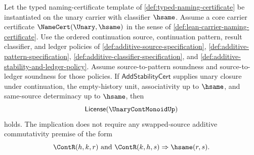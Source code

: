\begin{theorem}
\label{thm:unary-continuation-activation-without-commutativity}
Let the typed naming-certificate template of \autoref{def:typed-naming-certificate} be instantiated on the unary carrier with classifier $\hsame$. Assume a core carrier certificate $\NameCert(\Unary,\hsame)$ in the sense of \autoref{def:lean-carrier-naming-certificate}. Use the ordered continuation source, continuation pattern, result classifier, and ledger policies of \autoref{def:additive-source-specification}, \autoref{def:additive-pattern-specification}, \autoref{def:additive-classifier-specification}, and \autoref{def:additive-stability-and-ledger-policy}. Assume source-to-pattern soundness and source-to-ledger soundness for those policies. If $\mathsf{AddStabilityCert}$ supplies unary closure under continuation, the empty-history unit, associativity up to $\hsame$, and same-source determinacy up to $\hsame$, then
$$
  \mathsf{License}(\UnaryContMonoidUp)
$$
holds. The implication does not require any swapped-source additive commutativity premise of the form
$$
  \ContR(h,k,r)\ \text{and}\ \ContR(k,h,s)\Rightarrow \hsame(r,s).
$$
\end{theorem}
